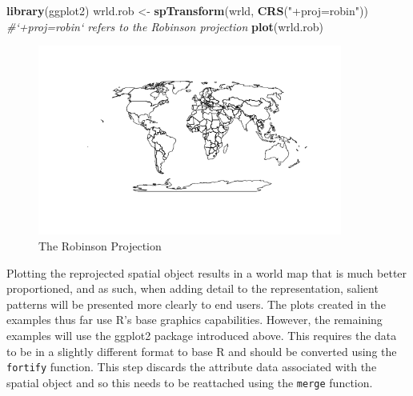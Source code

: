 \documentclass[]{article}
\newenvironment{Shaded}{}{}
\newcommand{\KeywordTok}[1]{\textcolor[rgb]{0.00,0.44,0.13}{\textbf{{#1}}}}
\newcommand{\StringTok}[1]{\textcolor[rgb]{0.25,0.44,0.63}{{#1}}}
\newcommand{\CommentTok}[1]{\textcolor[rgb]{0.38,0.63,0.69}{\textit{{#1}}}}
\newcommand{\NormalTok}[1]{{#1}}
\let\Oldincludegraphics\includegraphics
\renewcommand{\includegraphics}[1]{\Oldincludegraphics[width=10cm]{#1}}
\begin{document}
\begin{Shaded}
\begin{Highlighting}[]
\KeywordTok{library}\NormalTok{(ggplot2)}
\NormalTok{wrld.rob <- }\KeywordTok{spTransform}\NormalTok{(wrld, }\KeywordTok{CRS}\NormalTok{(}\StringTok{"+proj=robin"}\NormalTok{))  }\CommentTok{#`+proj=robin` refers to the Robinson projection}
\KeywordTok{plot}\NormalTok{(wrld.rob)}
\end{Highlighting}
\end{Shaded}
\begin{figure}[htbp]
\centering
\includegraphics{figure/The_Robinson_Projection.png}
\caption{The Robinson Projection}
\end{figure}

Plotting the reprojected spatial object results in a world map that is much better proportioned, and as such, when 
adding detail to the representation, salient patterns will be presented more clearly to end users. The
plots created in the examples thus far use R's base graphics capabilities. However, the remaining examples will use the ggplot2
package introduced above. This requires the data to be in a slightly different format to base R and should be converted using the \texttt{fortify} function. This step discards the attribute data associated with the spatial object and so this needs to be reattached using the \texttt{merge} function.
\end{document}
